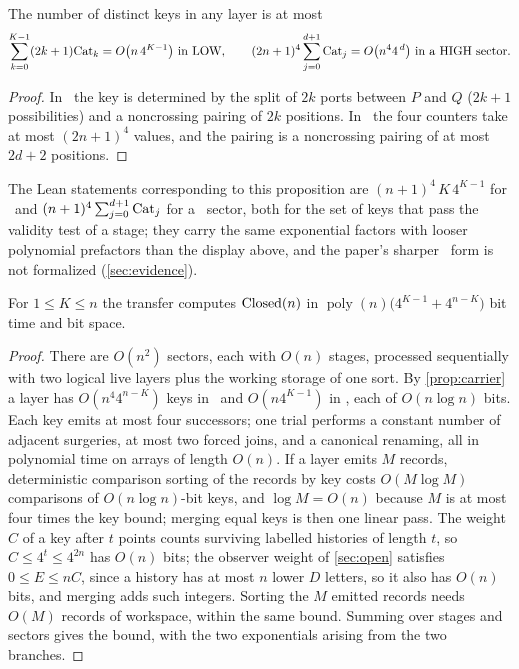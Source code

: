\begin{proposition}
\label{prop:carrier}
\leanok
{}
The number of distinct keys in any layer is at most
\[
 \sum_{k=0}^{K-1}(2k+1)\Cat_k=O\bigl(n\,4^{K-1}\bigr)\ \text{in \LOW},\qquad
 (2n+1)^{4}\sum_{j=0}^{d+1}\Cat_j=O\bigl(n^{4}4^{\,d}\bigr)\ \text{in a \HIGH\ sector}.
\]
\end{proposition}

\begin{proof}
\leanok
In \LOW\ the key is determined by the split of $2k$ ports between $P$ and $Q$
($2k+1$ possibilities) and a noncrossing pairing of $2k$ positions. In \HIGH\
the four counters take at most $(2n+1)^{4}$ values, and the pairing is a
noncrossing pairing of at most $2d+2$ positions.
\end{proof}

The Lean statements corresponding to this proposition are
$(n+1)^{4}\,K\,4^{K-1}$ for \LOW\ and $(n+1)^{4}\sum_{j=0}^{d+1}\mathrm{Cat}_j$ for a
\HIGH\ sector, both for the set of keys that pass the validity test of a
stage; they carry the same exponential factors with looser polynomial
prefactors than the display above, and the paper's sharper \LOW\ form is not
formalized (\cref{sec:evidence}).

\begin{theorem}
\label{thm:cost}
For $1\le K\le n$ the transfer computes $\operatorname{Closed}(n)$ in
$\operatorname{poly}(n)\bigl(4^{K-1}+4^{n-K}\bigr)$ bit time and bit space.
\end{theorem}

\begin{proof}
There are $O(n^{2})$ sectors, each with $O(n)$ stages, processed sequentially
with two logical live layers plus the working storage of one sort. By \cref{prop:carrier} a layer has $O(n^{4}4^{n-K})$
keys in \HIGH\ and $O(n4^{K-1})$ in \LOW, each of $O(n\log n)$ bits. Each
key emits at most four successors; one trial performs a constant number of
adjacent surgeries, at most two forced joins, and a canonical renaming, all in
polynomial time on arrays of length $O(n)$. If a layer emits $M$ records,
deterministic comparison sorting of the records by key costs $O(M\log M)$
comparisons of $O(n\log n)$-bit keys, and $\log M=O(n)$ because $M$ is at
most four times the key bound; merging equal keys is then one linear pass.
The weight $C$ of a key after $t$ points counts surviving labelled
histories of length $t$, so $C\le4^{t}\le4^{2n}$ has $O(n)$ bits; the
observer weight of \cref{sec:open} satisfies $0\le E\le nC$, since a history
has at most $n$ lower $D$ letters, so it also has $O(n)$ bits, and merging
adds such integers. Sorting the $M$ emitted records needs $O(M)$ records of
workspace, within the same bound. Summing over stages and sectors gives the
bound, with the two exponentials arising from the two branches.
\end{proof}

